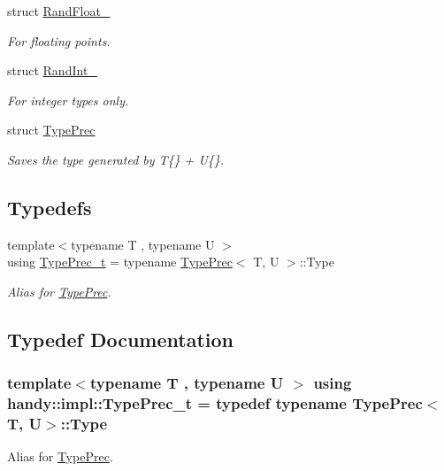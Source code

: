 \begin{DoxyCompactItemize}
struct \hyperlink{structhandy_1_1impl_1_1RandFloat__}{Rand\+Float\+\_\+}
\begin{DoxyCompactList}\small\item\em For floating points. \end{DoxyCompactList}\item 
struct \hyperlink{structhandy_1_1impl_1_1RandInt__}{Rand\+Int\+\_\+}
\begin{DoxyCompactList}\small\item\em For integer types only. \end{DoxyCompactList}\item 
struct \hyperlink{structhandy_1_1impl_1_1TypePrec}{Type\+Prec}
\begin{DoxyCompactList}\small\item\em Saves the type generated by {\ttfamily T\{\}} + {\ttfamily U\{\}}. \end{DoxyCompactList}\end{DoxyCompactItemize}
\subsection*{Typedefs}
\begin{DoxyCompactItemize}
\item 
{\footnotesize template$<$typename T , typename U $>$ }\\using \hyperlink{namespacehandy_1_1impl_acb422b65603bddb6d8a310035ea87e5c}{Type\+Prec\+\_\+t} = typename \hyperlink{structhandy_1_1impl_1_1TypePrec}{Type\+Prec}$<$ T, U $>$\+::Type
\begin{DoxyCompactList}\small\item\em Alias for \hyperlink{structhandy_1_1impl_1_1TypePrec}{Type\+Prec}. \end{DoxyCompactList}\end{DoxyCompactItemize}


\subsection{Typedef Documentation}
\subsubsection[{\texorpdfstring{Type\+Prec\+\_\+t}{TypePrec_t}}]{\setlength{\rightskip}{0pt plus 5cm}template$<$typename T , typename U $>$ using {\bf handy\+::impl\+::\+Type\+Prec\+\_\+t} = typedef typename {\bf Type\+Prec}$<$T, U$>$\+::Type}\hypertarget{namespacehandy_1_1impl_acb422b65603bddb6d8a310035ea87e5c}{}\label{namespacehandy_1_1impl_acb422b65603bddb6d8a310035ea87e5c}


Alias for \hyperlink{structhandy_1_1impl_1_1TypePrec}{Type\+Prec}. 

